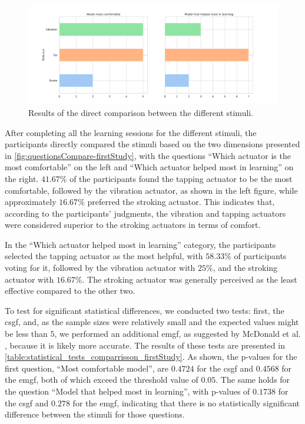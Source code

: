 \begin{figure}
    \centering
    \includegraphics[width=\linewidth]{src/pictures/Study1Data_questionnaire/questions_compare_study1.pdf}
    \caption{Results of the direct comparison between the different stimuli.}
    \label{fig:questionsCompare-firstStudy}
\end{figure}

After completing all the learning sessions for the different stimuli, the participants directly compared the stimuli based on the two dimensions presented in \autoref{fig:questionsCompare-firstStudy}, with the questions \enquote{Which actuator is the most comfortable} on the left and \enquote{Which actuator helped most in learning} on the right. 
$41.67\%$ of the participants found the tapping actuator to be the most comfortable, followed by the vibration actuator, as shown in the left figure, while approximately $16.67\%$ preferred the stroking actuator. This indicates that, according to the participants' judgments, the vibration and tapping actuators were considered superior to the stroking actuators in terms of comfort.

In the \enquote{Which actuator helped most in learning} category, the participants selected the tapping actuator as the most helpful, with $58.33\%$ of participants voting for it, followed by the vibration actuator with $25\%$, and the stroking actuator with $16.67\%$. The stroking actuator was generally perceived as the least effective compared to the other two.

To test for significant statistical differences, we conducted two tests: first, the \gls{csgf}, and, as the sample sizes were relatively small and the expected values might be less than $5$, we performed an additional \gls{emgf}, as suggested by McDonald et al. \cite{mcdonald2014handbook}, because it is likely more accurate. 
The results of these tests are presented in \autoref{table:statistical_tests_comparrisson_firstStudy}. 
As shown, the p-values for the first question, \enquote{Most comfortable model}, are $0.4724$ for the \gls{csgf} and $0.4568$ for the \gls{emgf}, both of which exceed the threshold value of $0.05$. 
The same holds for the question \enquote{Model that helped most in learning}, with p-values of $0.1738$ for the \gls{csgf} and $0.278$ for the \gls{emgf}, indicating that there is no statistically significant difference between the stimuli for those questions.


